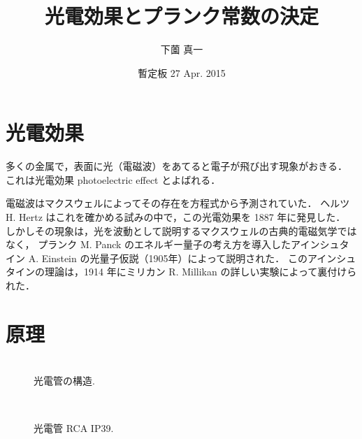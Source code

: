\documentclass[11pt,sort]{jarticle}
\title{光電効果とプランク常数の決定}
\author{下薗 真一}
\date{暫定板 27 Apr. 2015}
\begin{document}
\maketitle

\section{光電効果}

多くの金属で，表面に光（電磁波）をあてると電子が飛び出す現象がおきる．
これは光電効果 photoelectric effect とよばれる．

電磁波はマクスウェルによってその存在を方程式から予測されていた．
ヘルツ H. Hertz はこれを確かめる試みの中で，この光電効果を 1887 年に発見した．
しかしその現象は，光を波動として説明するマクスウェルの古典的電磁気学ではなく，
プランク M. Panck のエネルギー量子の考え方を導入したアインシュタイン A. Einstein の光量子仮説（1905年）\cite{Einstein-1905-ap891}によって説明された．
このアインシュタインの理論は，1914 年にミリカン R. Millikan の詳しい実験によって裏付けられた．

\section{原理}

\begin{figure}[t]
\begin{minipage}[t]{.4\textwidth}
\begin{center}
\\
\caption{光電管の構造. }\label{fig:phototube} 
\end{center}
\end{minipage}
\hfill
\begin{minipage}[t]{.5\textwidth}
\begin{center}
\\
\caption{光電管 RCA IP39. }\label{fig:IP39} 
\end{center}
\end{minipage}
\end{figure}
\end{document}
